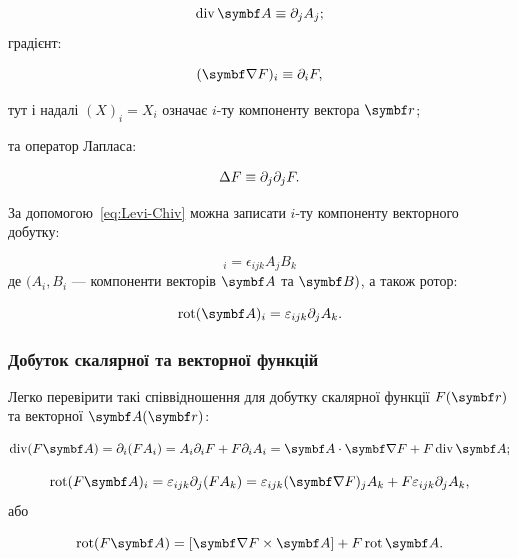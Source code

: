 \begin{equation*}
\Div \vect{A} \equiv \partial_j A_j;
\end{equation*}
%
градієнт:

\begin{equation*}
(\grad F)_i \equiv \partial_i F,
\end{equation*}

тут і надалі \((X)_i = X_i\) означає \(i\)-ту компоненту вектора \(\vect{r}\);

та оператор Лапласа:

\begin{equation*}
\Delta F \equiv \partial_j \partial_j F.
\end{equation*}



За допомогою~\eqref{eq:Levi-Chiv} можна записати \(i\)-ту компоненту векторного добутку:

\begin{equation*}
[\vect{A} \times \Bfield]_i = \epsilon_{ijk} A_j B_k
\end{equation*}
%
де \((A_i, B_i\) --- компоненти векторів \(\vect{A}\) та \(\Bfield)\), а також ротор:

\begin{equation*}
\Rot(\vect{A})_i = \epsilon_{ijk} \partial_j A_k.
\end{equation*}

\subsubsection{Добуток скалярної та векторної функцій}

Легко перевірити такі співвідношення для добутку скалярної функції \( F(\vect{r}) \) та векторної \( \vect{A}(\vect{r}) \):

\begin{equation*}
\Div(F \vect{A}) = \partial_i (F A_i) = A_i \partial_i F + F \partial_i A_i = \vect{A} \cdot \grad F + F \Div \vect{A};
\end{equation*}

\begin{equation*}
\Rot(F \vect{A})_i = \epsilon_{ijk} \partial_j (F A_k) = \epsilon_{ijk} (\grad F)_j A_k + F \epsilon_{ijk} \partial_j A_k,
\end{equation*}
%
або

\begin{equation*}
\Rot(F \vect{A}) = [\grad F \times \vect{A}] + F \Rot \vect{A}.
\end{equation*}

